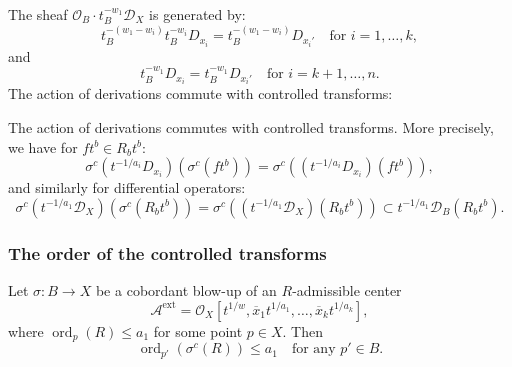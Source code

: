 \documentclass{amsart}
\renewcommand{\cD}{{\mathcal D}}
\newcommand{\ext}{{\operatorname{ext}}}
\newcommand{\ord}{{\operatorname{ord}}}
\begin{document}
The sheaf \( \mathcal{O}_B \cdot t_B^{-w_1} \mathcal{D}_X \) is generated by:
\[
t_B^{-(w_1 - w_i)} t_B^{-w_i} D_{x_i} = t_B^{-(w_1 - w_i)} D_{x_i'}
\quad \text{for } i = 1, \ldots, k,
\]
and
\[
t_B^{-w_1} D_{x_i} = t_B^{-w_1} D_{x_i'}
\quad \text{for } i = k+1, \ldots, n.
\]
The action of derivations commute with controlled transforms:
\begin{lemma} \label{DER}
The action of derivations commutes with controlled transforms. More precisely, we have for $ft^b\in R_bt^b$:
\[
\sigma^c\left(t^{-1/a_i} D_{x_i}\right)\left(\sigma^c\left(f t^{b}\right)\right)
= \sigma^c\left(\left(t^{-1/a_i} D_{x_i}\right)\left(f t^{b}\right)\right),
\]
and similarly for differential operators:
\[
\sigma^c\left(t^{-1/a_1} \mathcal{D}_X\right)\left(\sigma^c\left(R_b t^{b}\right)\right)
= \sigma^c\left(\left(t^{-1/a_1} \mathcal{D}_X\right)\left(R_b t^{b}\right)\right)\subset   t^{-1/a_1}\cD_B \left(R_b t^{b}\right).
\]
\end{lemma}

\subsubsection{The order of the controlled transforms}

\begin{lemma}
Let $\sigma: B \to X$ be a cobordant blow-up of an $R$-admissible center 
\[
\mathcal{A}^\ext = \mathcal{O}_X[t^{1/w}, \overline{x}_1 t^{1/a_1}, \ldots, \overline{x}_k t^{1/a_k}],
\]
where $\ord_p(R) \leq a_1$ for some point $p \in X$. Then 
\[
\ord_{p'}(\sigma^c(R)) \leq a_1 \quad \text{for any } p' \in B.
\]
\end{lemma}
\end{document}
